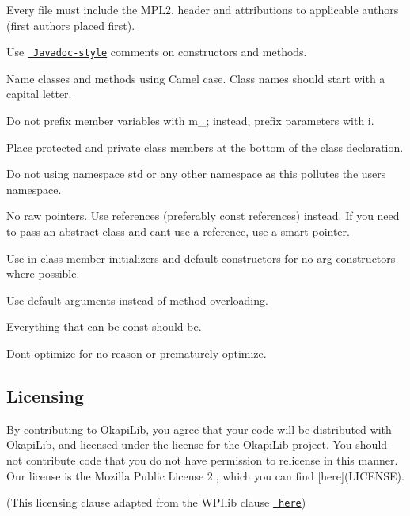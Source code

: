 \begin{DoxyItemize}
\item Every file must include the M\+P\+L2. header and attributions to applicable authors (first authors placed first).
\item Use \href{https://www.tutorialspoint.com/java/java_documentation.htm}{\texttt{ Javadoc-\/style}} comments on constructors and methods.
\item Name classes and methods using Camel case. Class names should start with a capital letter.
\item Do not prefix member variables with {\ttfamily m\+\_\+}; instead, prefix parameters with {\ttfamily i}.
\item Place protected and private class members at the bottom of the class declaration.
\item Do not {\ttfamily using namespace std} or any other namespace as this pollutes the user\textquotesingle{}s namespace.
\item No raw pointers. Use references (preferably {\ttfamily const} references) instead. If you need to pass an abstract class and can\textquotesingle{}t use a reference, use a smart pointer.
\item Use in-\/class member initializers and default constructors for no-\/arg constructors where possible.
\item Use default arguments instead of method overloading.
\item Everything that can be {\ttfamily const} should be.
\item Don\textquotesingle{}t optimize for no reason or prematurely optimize.
\end{DoxyItemize}

\subsection*{Licensing}

By contributing to Okapi\+Lib, you agree that your code will be distributed with Okapi\+Lib, and licensed under the license for the Okapi\+Lib project. You should not contribute code that you do not have permission to relicense in this manner. Our license is the Mozilla Public License 2., which you can find \mbox{[}here\mbox{]}(L\+I\+C\+E\+N\+SE).

(This licensing clause adapted from the W\+P\+Ilib clause \href{https://github.com/wpilibsuite/allwpilib/blob/master/CONTRIBUTING.md\#licensing}{\texttt{ here}}) 